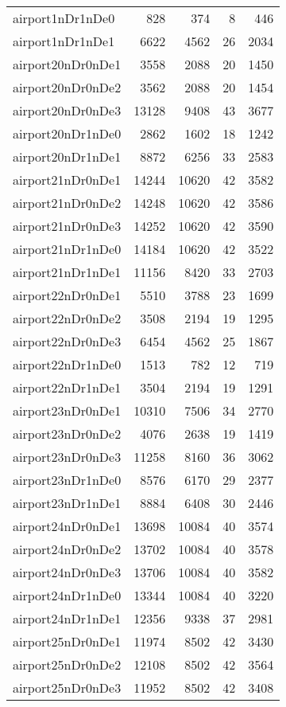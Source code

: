 \begin{tabular}{lrrrr}
airport1nDr1nDe0 & 828 & 374 & 8 & 446 \\
airport1nDr1nDe1 & 6622 & 4562 & 26 & 2034 \\
airport20nDr0nDe1 & 3558 & 2088 & 20 & 1450 \\
airport20nDr0nDe2 & 3562 & 2088 & 20 & 1454 \\
airport20nDr0nDe3 & 13128 & 9408 & 43 & 3677 \\
airport20nDr1nDe0 & 2862 & 1602 & 18 & 1242 \\
airport20nDr1nDe1 & 8872 & 6256 & 33 & 2583 \\
airport21nDr0nDe1 & 14244 & 10620 & 42 & 3582 \\
airport21nDr0nDe2 & 14248 & 10620 & 42 & 3586 \\
airport21nDr0nDe3 & 14252 & 10620 & 42 & 3590 \\
airport21nDr1nDe0 & 14184 & 10620 & 42 & 3522 \\
airport21nDr1nDe1 & 11156 & 8420 & 33 & 2703 \\
airport22nDr0nDe1 & 5510 & 3788 & 23 & 1699 \\
airport22nDr0nDe2 & 3508 & 2194 & 19 & 1295 \\
airport22nDr0nDe3 & 6454 & 4562 & 25 & 1867 \\
airport22nDr1nDe0 & 1513 & 782 & 12 & 719 \\
airport22nDr1nDe1 & 3504 & 2194 & 19 & 1291 \\
airport23nDr0nDe1 & 10310 & 7506 & 34 & 2770 \\
airport23nDr0nDe2 & 4076 & 2638 & 19 & 1419 \\
airport23nDr0nDe3 & 11258 & 8160 & 36 & 3062 \\
airport23nDr1nDe0 & 8576 & 6170 & 29 & 2377 \\
airport23nDr1nDe1 & 8884 & 6408 & 30 & 2446 \\
airport24nDr0nDe1 & 13698 & 10084 & 40 & 3574 \\
airport24nDr0nDe2 & 13702 & 10084 & 40 & 3578 \\
airport24nDr0nDe3 & 13706 & 10084 & 40 & 3582 \\
airport24nDr1nDe0 & 13344 & 10084 & 40 & 3220 \\
airport24nDr1nDe1 & 12356 & 9338 & 37 & 2981 \\
airport25nDr0nDe1 & 11974 & 8502 & 42 & 3430 \\
airport25nDr0nDe2 & 12108 & 8502 & 42 & 3564 \\
airport25nDr0nDe3 & 11952 & 8502 & 42 & 3408 \\

\end{tabular}

